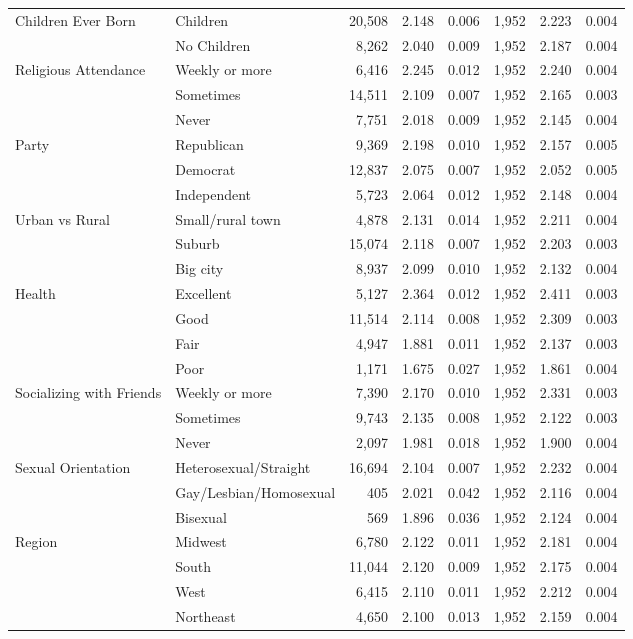 \begin{table}[htbp]
\begin{tabular}{llrrrrrr}
\midrule
Children Ever Born & Children & 20,508 & 2.148 & 0.006 & 1,952 & 2.223 & 0.004 \\
 & No Children & 8,262 & 2.040 & 0.009 & 1,952 & 2.187 & 0.004 \\
\midrule
Religious Attendance & Weekly or more & 6,416 & 2.245 & 0.012 & 1,952 & 2.240 & 0.004 \\
 & Sometimes & 14,511 & 2.109 & 0.007 & 1,952 & 2.165 & 0.003 \\
 & Never & 7,751 & 2.018 & 0.009 & 1,952 & 2.145 & 0.004 \\
\midrule
Party & Republican & 9,369 & 2.198 & 0.010 & 1,952 & 2.157 & 0.005 \\
 & Democrat & 12,837 & 2.075 & 0.007 & 1,952 & 2.052 & 0.005 \\
 & Independent & 5,723 & 2.064 & 0.012 & 1,952 & 2.148 & 0.004 \\
\midrule
Urban vs Rural & Small/rural town & 4,878 & 2.131 & 0.014 & 1,952 & 2.211 & 0.004 \\
 & Suburb & 15,074 & 2.118 & 0.007 & 1,952 & 2.203 & 0.003 \\
 & Big city & 8,937 & 2.099 & 0.010 & 1,952 & 2.132 & 0.004 \\
\midrule
Health & Excellent & 5,127 & 2.364 & 0.012 & 1,952 & 2.411 & 0.003 \\
 & Good & 11,514 & 2.114 & 0.008 & 1,952 & 2.309 & 0.003 \\
 & Fair & 4,947 & 1.881 & 0.011 & 1,952 & 2.137 & 0.003 \\
 & Poor & 1,171 & 1.675 & 0.027 & 1,952 & 1.861 & 0.004 \\
\midrule
Socializing with Friends & Weekly or more & 7,390 & 2.170 & 0.010 & 1,952 & 2.331 & 0.003 \\
 & Sometimes & 9,743 & 2.135 & 0.008 & 1,952 & 2.122 & 0.003 \\
 & Never & 2,097 & 1.981 & 0.018 & 1,952 & 1.900 & 0.004 \\
\midrule
Sexual Orientation & Heterosexual/Straight & 16,694 & 2.104 & 0.007 & 1,952 & 2.232 & 0.004 \\
 & Gay/Lesbian/Homosexual & 405 & 2.021 & 0.042 & 1,952 & 2.116 & 0.004 \\
 & Bisexual & 569 & 1.896 & 0.036 & 1,952 & 2.124 & 0.004 \\
\midrule
Region & Midwest & 6,780 & 2.122 & 0.011 & 1,952 & 2.181 & 0.004 \\
 & South & 11,044 & 2.120 & 0.009 & 1,952 & 2.175 & 0.004 \\
 & West & 6,415 & 2.110 & 0.011 & 1,952 & 2.212 & 0.004 \\
 & Northeast & 4,650 & 2.100 & 0.013 & 1,952 & 2.159 & 0.004 \\
\bottomrule
\end{tabular}
\end{table}

